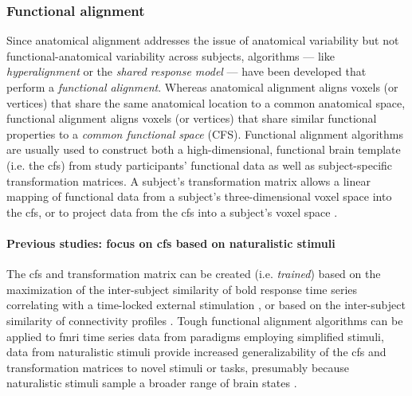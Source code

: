 \subsubsection{Functional alignment}
%
Since anatomical alignment addresses the issue of anatomical variability but not
functional-anatomical variability across subjects, algorithms --- like
\textit{hyperalignment} \citep{haxby2011common, guntupalli2016model} or the
\textit{shared response model} \citep{chen2015reduced, zhang2016searchlight} ---
have been developed that perform a \textit{functional alignment}.
%
Whereas anatomical alignment aligns voxels (or vertices) that share the same
anatomical location to a common anatomical space, functional alignment aligns
voxels (or vertices) that share similar functional properties to
a \textit{common functional space} (CFS).
%
Functional alignment algorithms are usually used to construct both a
high-dimensional, functional brain template (i.e. the \ac{cfs}) from study
participants' functional data as well as subject-specific transformation
matrices.
%
A subject's transformation matrix allows a linear mapping of functional data
from a subject's three-dimensional voxel space into the \ac{cfs}, or to project
data from the \ac{cfs} into a subject's voxel space
\citep{haxby2020hyperalignment, kumar2020brainiak}.


\paragraph{Previous studies: focus on \ac{cfs} based on naturalistic stimuli}

%
The \ac{cfs} and transformation matrix can be created (i.e.  \textit{trained})
based on the maximization of the inter-subject similarity of \ac{bold} response
time series correlating with a time-locked external stimulation
\citep{haxby2011common, chen2015reduced, sabuncu2010function}, or based on the
inter-subject similarity of connectivity profiles \citep{feilong2018reliable,
guntupalli2018computational, nastase2019leveraging}.
%
Tough functional alignment algorithms can be applied to \ac{fmri} time series
data from paradigms employing simplified stimuli, data from naturalistic stimuli
provide increased generalizability of the \ac{cfs} and transformation matrices
to novel stimuli or tasks, presumably because naturalistic stimuli sample a
broader range of brain states \citep{haxby2011common, guntupalli2016model}.



